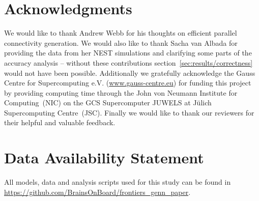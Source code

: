 \documentclass[utf8]{frontiersSCNS} %
\begin{document}
\section*{Acknowledgments}
We would like to thank Andrew Webb for his thoughts on efficient parallel connectivity generation.
We would also like to thank Sacha van Albada for providing the data from her NEST simulations and clarifying some parts of the accuracy analysis -- without these contributions section~\ref{sec:results/correctness} would not have been possible.
Additionally we gratefully acknowledge the Gauss Centre for Supercomputing e.V. (\url{www.gauss-centre.eu}) for funding this project by providing computing time through the John von Neumann Institute for Computing~(NIC) on the GCS Supercomputer JUWELS at J{\"u}lich Supercomputing Centre~(JSC).
Finally we would like to thank our reviewers for their helpful and valuable feedback.

\section*{Data Availability Statement}
All models, data and analysis scripts used for this study can be found in \url{https://github.com/BrainsOnBoard/frontiers_genn_paper}.
%



\end{document}
